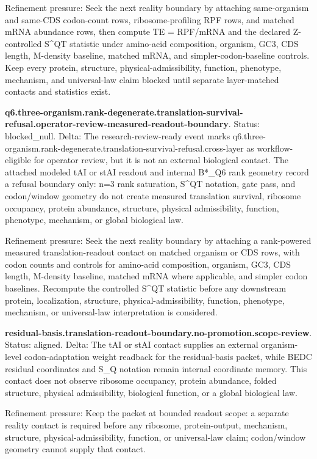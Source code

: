 Refinement pressure: Seek the next reality boundary by attaching same-organism and same-CDS codon-count rows, ribosome-profiling RPF rows, and matched mRNA abundance rows, then compute TE = RPF/mRNA and the declared Z-controlled S\textasciicircum{}QT statistic under amino-acid composition, organism, GC3, CDS length, M-density baseline, matched mRNA, and simpler-codon-baseline controls. Keep every protein, structure, physical-admissibility, function, phenotype, mechanism, and universal-law claim blocked until separate layer-matched contacts and statistics exist.

\textbf{q6.three-organism.rank-degenerate.translation-survival-refusal.operator-review-measured-readout-boundary}. Status: blocked\_null. Delta: The research-review-ready event marks q6.three-organism.rank-degenerate.translation-survival-refusal.cross-layer as workflow-eligible for operator review, but it is not an external biological contact. The attached modeled tAI or stAI readout and internal B*\_Q6 rank geometry record a refusal boundary only: n=3 rank saturation, S\textasciicircum{}QT notation, gate pass, and codon/window geometry do not create measured translation survival, ribosome occupancy, protein abundance, structure, physical admissibility, function, phenotype, mechanism, or global biological law.

Refinement pressure: Seek the next reality boundary by attaching a rank-powered measured translation-readout contact on matched organism or CDS rows, with codon counts and controls for amino-acid composition, organism, GC3, CDS length, M-density baseline, matched mRNA where applicable, and simpler codon baselines. Recompute the controlled S\textasciicircum{}QT statistic before any downstream protein, localization, structure, physical-admissibility, function, phenotype, mechanism, or universal-law interpretation is considered.

\textbf{residual-basis.translation-readout-boundary.no-promotion.scope-review}. Status: aligned. Delta: The tAI or stAI contact supplies an external organism-level codon-adaptation weight readback for the residual-basis packet, while BEDC residual coordinates and S\_Q notation remain internal coordinate memory. This contact does not observe ribosome occupancy, protein abundance, folded structure, physical admissibility, biological function, or a global biological law.

Refinement pressure: Keep the packet at bounded readout scope: a separate reality contact is required before any ribosome, protein-output, mechanism, structure, physical-admissibility, function, or universal-law claim; codon/window geometry cannot supply that contact.

